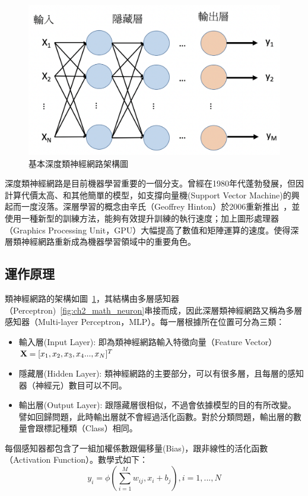 \begin{figure}[h]
\centering
\includegraphics[scale=0.3]{images/ch2_DNN.png}
\caption{基本深度類神經網路架構圖} \label{fig:ch2_DNN}
\end{figure}

深度類神經網路是目前機器學習重要的一個分支。曾經在1980年代蓬勃發展，但因計算代價太高、和其他簡單的模型，如支撐向量機(Support
Vector Machine)的興起而一度沒落。深層學習的概念由辛氏（Geoffrey Hinton）於2006重新推出~\cite{hinton2006fast}，並使用一種新型的訓練方法，能夠有效提升訓練的執行速度；加上圖形處理器（Graphics
Processing
Unit，GPU）大幅提高了數值和矩陣運算的速度。使得深層類神經網路重新成為機器學習領域中的重要角色。
\subsection{運作原理}
類神經網路的架構如圖~\ref{fig:ch2_DNN}，其結構由多層感知器（Perceptron)~\ref{fig:ch2_math_neuron}串接而成，因此深層類神經網路又稱為多層感知器（Multi-layer
Perceptron，MLP）。每一層根據所在位置可分為三類：
\begin{itemize}
\item    輸入層(Input Layer): 即為類神經網路輸入特徵向量（Feature Vector）$\bold{X} = [x_1 , x_2 , x_3 , x_4 ... , x_N]^T$
\item    隱藏層(Hidden Layer): 類神經網路的主要部分，可以有很多層，且每層的感知器（神經元）數目可以不同。
\item    輸出層(Output Layer): 跟隱藏層很相似，不過會依據模型的目的有所改變。譬如回歸問題，此時輸出層就不會經過活化函數。對於分類問題，輸出層的數量會跟標記種類（Class）相同。
\end{itemize}

每個感知器都包含了一組加權係數跟偏移量(Bias)，跟非線性的活化函數（Activation
Function）。數學式如下：
\begin{equation}
	y_i = \phi{(\sum_{i=1}^{M} w_{ij},x_i+b_j) } , i = 1,...,N
\end{equation}

